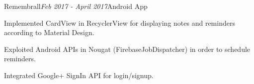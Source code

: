\begin{rSubsection}{Remembrall}{\em Feb 2017 - April 2017}{Android App}{}
  \item Implemented CardView in RecyclerView for displaying notes and reminders according to Material Design.
  \item Exploited Android APIs in Nougat (FirebaseJobDispatcher) in order to schedule reminders.
  \item Integrated Google+ SignIn API for login/signup.
\end{rSubsection}